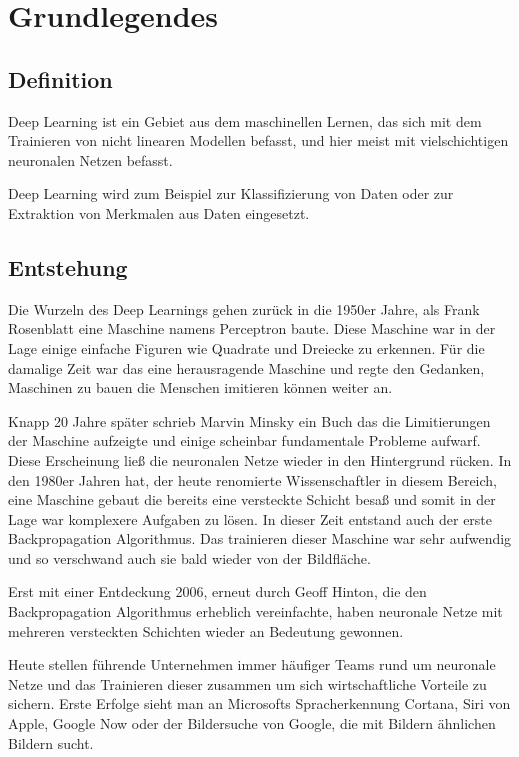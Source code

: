\chapter{Grundlegendes}
\label{cha:grundlegendes}

\section{Definition}

Deep Learning ist ein Gebiet aus dem maschinellen Lernen, das sich mit dem Trainieren von nicht linearen Modellen befasst, und hier meist mit vielschichtigen neuronalen Netzen befasst.

Deep Learning wird zum Beispiel zur Klassifizierung von Daten oder zur Extraktion von Merkmalen aus Daten eingesetzt.

\section{Entstehung}

Die Wurzeln des Deep Learnings gehen zurück in die 1950er Jahre, als Frank Rosenblatt eine Maschine namens Perceptron baute. Diese Maschine war in der Lage einige einfache Figuren wie Quadrate und Dreiecke zu erkennen. Für die damalige Zeit war das eine herausragende Maschine und regte den Gedanken, Maschinen zu bauen die Menschen imitieren können weiter an.

Knapp 20 Jahre später schrieb Marvin Minsky ein Buch das die Limitierungen der Maschine aufzeigte und einige scheinbar fundamentale Probleme aufwarf. Diese Erscheinung ließ die neuronalen Netze wieder in den Hintergrund rücken.
In den 1980er Jahren hat, der heute renomierte Wissenschaftler in diesem Bereich, eine Maschine gebaut die bereits eine versteckte Schicht besaß und somit in der Lage war komplexere Aufgaben zu lösen. In dieser Zeit entstand auch der erste Backpropagation Algorithmus. Das trainieren dieser Maschine war sehr aufwendig und so verschwand auch sie bald wieder von der Bildfläche. 

Erst mit einer Entdeckung 2006, erneut durch Geoff Hinton, die den Backpropagation Algorithmus erheblich vereinfachte, haben neuronale Netze mit mehreren versteckten Schichten wieder an Bedeutung gewonnen. 

Heute stellen führende Unternehmen immer häufiger Teams rund um neuronale Netze und das Trainieren dieser zusammen um sich wirtschaftliche Vorteile zu sichern. Erste Erfolge sieht man an Microsofts Spracherkennung Cortana, Siri von Apple, Google Now oder der Bildersuche von Google, die mit Bildern ähnlichen Bildern sucht.


